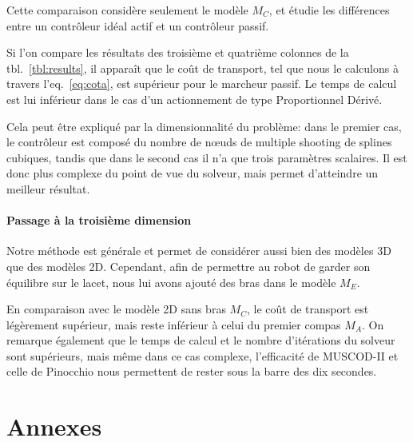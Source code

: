 \documentclass[french,A4paper,]{book}
\begin{document}
Cette comparaison considère seulement le modèle \(M_C\), et étudie les
différences entre un contrôleur idéal actif et un contrôleur passif.

Si l'on compare les résultats des troisième et quatrième colonnes de la
tbl.~\ref{tbl:results}, il apparaît que le coût de transport, tel que
nous le calculons à travers l'eq.~\ref{eq:cota}, est supérieur pour le
marcheur passif. Le temps de calcul est lui inférieur dans le cas d'un
actionnement de type Proportionnel Dérivé.

Cela peut être expliqué par la dimensionnalité du problème: dans le
premier cas, le contrôleur est composé du nombre de nœuds de multiple
shooting de splines cubiques, tandis que dans le second cas il n'a que
trois paramètres scalaires. Il est donc plus complexe du point de vue du
solveur, mais permet d'atteindre un meilleur résultat.

\subsection{Passage à la troisième
dimension}\label{passage-uxe0-la-troisiuxe8me-dimension}

Notre méthode est générale et permet de considérer aussi bien des
modèles 3D que des modèles 2D. Cependant, afin de permettre au robot de
garder son équilibre sur le lacet, nous lui avons ajouté des bras dans
le modèle \(M_E\).

En comparaison avec le modèle 2D sans bras \(M_C\), le coût de transport
est légèrement supérieur, mais reste inférieur à celui du premier compas
\(M_A\). On remarque également que le temps de calcul et le nombre
d'itérations du solveur sont supérieurs, mais même dans ce cas complexe,
l'efficacité de MUSCOD-II et celle de Pinocchio nous permettent de
rester sous la barre des dix secondes.

\appendix

\part*{Annexes}\label{annexes}

\renewcommand{\thechapter}{\arabic{chapter}}
\renewcommand{\thefigure}{\arabic{chapter}-\arabic{figure}}
\renewcommand{\thetable}{\arabic{chapter}-\arabic{table}}
\renewcommand{\thealgorithm}{\arabic{chapter}-\arabic{algorithm}}

\setcounter{figure}{0} \setcounter{table}{0} \setcounter{algorithm}{0}
\end{document}
